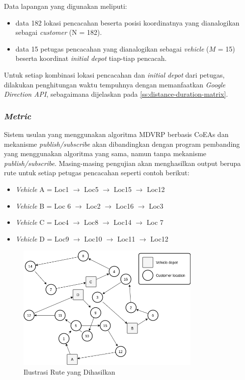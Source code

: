 Data lapangan yang digunakan meliputi:
\begin{itemize}
	\item data 182 lokasi pencacahan beserta posisi koordinatnya yang dianalogikan sebagai \textit{customer} (N = 182). 
	\item data 15 petugas pencacahan yang dianalogikan sebagai \textit{vehicle} ($M$ = 15) beserta koordinat \textit{initial depot} tiap-tiap pencacah.
\end{itemize}

Untuk setiap kombinasi lokasi pencacahan dan \textit{initial depot} dari petugas, dilakukan penghitungan waktu tempuhnya dengan memanfaatkan \textit{Google Direction API}, sebagaimana dijelaskan pada \autoref{ss:distance-duration-matrix}.


\subsubsection{\textit{Metric}}
\label{sssec:metric}
Sistem usulan yang menggunakan algoritma MDVRP berbasis CoEAs dan mekanisme \textit{publish/subscribe} akan dibandingkan dengan program pembanding yang menggunakan algoritma yang sama, namun tanpa mekanisme \textit{publish/subscribe}. Masing-masing pengujian akan menghasilkan output berupa rute untuk setiap petugas pencacahan seperti contoh berikut:

\begin{itemize}
	\item \textit{Vehicle} A = Loc1 $\rightarrow$ Loc5 $\rightarrow$ Loc15 $\rightarrow$ Loc12
	\item \textit{Vehicle} B = Loc 6 $\rightarrow$ Loc2 $\rightarrow$ Loc16 $\rightarrow$ Loc3
	\item \textit{Vehicle} C = Loc4 $\rightarrow$ Loc8 $\rightarrow$ Loc14 $\rightarrow$ Loc 7
	\item \textit{Vehicle} D = Loc9 $\rightarrow$ Loc10 $\rightarrow$ Loc11 $\rightarrow$ Loc12
\end{itemize}


\begin{figure}[!]
	\centering
	\includegraphics[width=9cm]{Resources/Images/result-mdvrp-illustration}
	\caption{Ilustrasi Rute yang Dihasilkan}
	\label{fig:result-mdvrp-illustration}
\end{figure}


